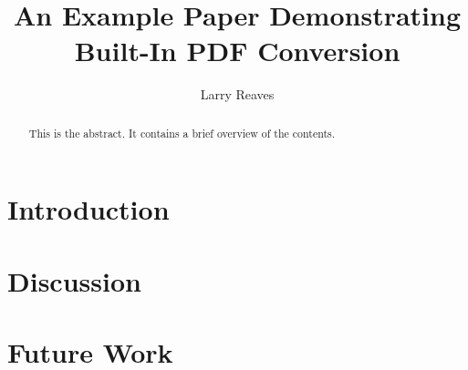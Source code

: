\documentclass{report}
\begin{document}
\title{An Example Paper Demonstrating Built-In PDF Conversion}
\author{Larry Reaves}
\maketitle
\begin{abstract}
This is the abstract.  It contains a brief overview of the contents.
\end{abstract}

\pagebreak

\begin{doublespace}
\chapter{Introduction}

\chapter{Discussion}

\chapter{Future Work}

\end{doublespace}
\end{document}

